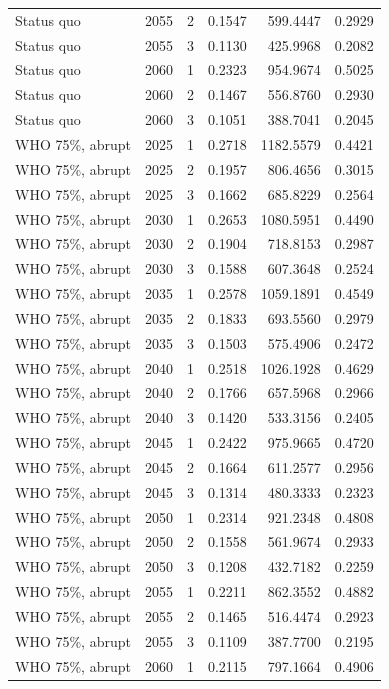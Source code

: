 \begin{longtable}{lrrrrr}
Status quo & 2055 & 2 & 0.1547 & 599.4447 & 0.2929 \\
Status quo & 2055 & 3 & 0.1130 & 425.9968 & 0.2082 \\
Status quo & 2060 & 1 & 0.2323 & 954.9674 & 0.5025 \\
Status quo & 2060 & 2 & 0.1467 & 556.8760 & 0.2930 \\
Status quo & 2060 & 3 & 0.1051 & 388.7041 & 0.2045 \\
WHO 75\%, abrupt & 2025 & 1 & 0.2718 & 1182.5579 & 0.4421 \\
WHO 75\%, abrupt & 2025 & 2 & 0.1957 & 806.4656 & 0.3015 \\
WHO 75\%, abrupt & 2025 & 3 & 0.1662 & 685.8229 & 0.2564 \\
WHO 75\%, abrupt & 2030 & 1 & 0.2653 & 1080.5951 & 0.4490 \\
WHO 75\%, abrupt & 2030 & 2 & 0.1904 & 718.8153 & 0.2987 \\
WHO 75\%, abrupt & 2030 & 3 & 0.1588 & 607.3648 & 0.2524 \\
WHO 75\%, abrupt & 2035 & 1 & 0.2578 & 1059.1891 & 0.4549 \\
WHO 75\%, abrupt & 2035 & 2 & 0.1833 & 693.5560 & 0.2979 \\
WHO 75\%, abrupt & 2035 & 3 & 0.1503 & 575.4906 & 0.2472 \\
WHO 75\%, abrupt & 2040 & 1 & 0.2518 & 1026.1928 & 0.4629 \\
WHO 75\%, abrupt & 2040 & 2 & 0.1766 & 657.5968 & 0.2966 \\
WHO 75\%, abrupt & 2040 & 3 & 0.1420 & 533.3156 & 0.2405 \\
WHO 75\%, abrupt & 2045 & 1 & 0.2422 & 975.9665 & 0.4720 \\
WHO 75\%, abrupt & 2045 & 2 & 0.1664 & 611.2577 & 0.2956 \\
WHO 75\%, abrupt & 2045 & 3 & 0.1314 & 480.3333 & 0.2323 \\
WHO 75\%, abrupt & 2050 & 1 & 0.2314 & 921.2348 & 0.4808 \\
WHO 75\%, abrupt & 2050 & 2 & 0.1558 & 561.9674 & 0.2933 \\
WHO 75\%, abrupt & 2050 & 3 & 0.1208 & 432.7182 & 0.2259 \\
WHO 75\%, abrupt & 2055 & 1 & 0.2211 & 862.3552 & 0.4882 \\
WHO 75\%, abrupt & 2055 & 2 & 0.1465 & 516.4474 & 0.2923 \\
WHO 75\%, abrupt & 2055 & 3 & 0.1109 & 387.7700 & 0.2195 \\
WHO 75\%, abrupt & 2060 & 1 & 0.2115 & 797.1664 & 0.4906 \\

\end{longtable}
